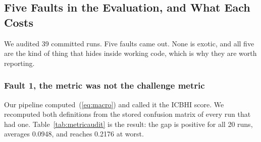 \documentclass[journal,onecolumn]{IEEEtran}
\begin{document}
\subsection{Five Faults in the Evaluation, and What Each Costs}
\label{subsec:protocol}

We audited 39 committed runs. Five faults came out. None is exotic, and all five are the
kind of thing that hides inside working code, which is why they are worth reporting.

\subsubsection{Fault 1, the metric was not the challenge metric}
Our pipeline computed~(\ref{eq:macro}) and called it the ICBHI score. We recomputed both
definitions from the stored confusion matrix of every run that had one.
Table~\ref{tab:metricaudit} is the result: the gap is positive for all 20 runs, averages
0.0948, and reaches 0.2176 at worst.
\end{document}
